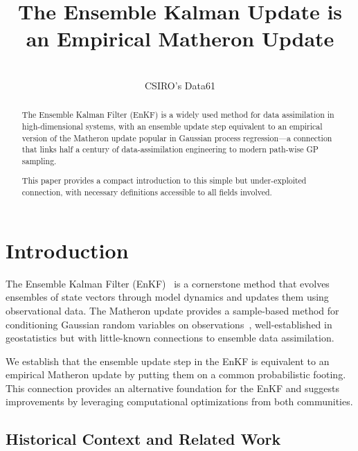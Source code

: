 \documentclass[wcp]{jmlr} %
\title[Ensemble Kalman Update]{The Ensemble Kalman Update is an Empirical Matheron Update}
\author{\Name{Dan MacKinlay\,\orcidlink{0000-0001-6077-2684}}\\
  \addr CSIRO's Data61}
\begin{document}
\maketitle

\begin{abstract}
The Ensemble Kalman Filter (EnKF) is a widely used method for data assimilation in high-dimensional systems, with an ensemble update step equivalent to an empirical version of the Matheron update popular in Gaussian process regression—a connection that links half a century of data-assimilation engineering to modern path-wise GP sampling.

This paper provides a compact introduction to this simple but under-exploited connection, with necessary definitions accessible to all fields involved.
\end{abstract}


\section{Introduction}

The Ensemble Kalman Filter (EnKF)~\citep{Evensen2003Ensemble,Evensen2009Data} is a cornerstone method that evolves ensembles of state vectors through model dynamics and updates them using observational data. The Matheron update provides a sample-based method for conditioning Gaussian random variables on observations~\citep{Doucet2010Note,Wilson2020Efficiently,Wilson2021Pathwise}, well-established in geostatistics but with little-known connections to ensemble data assimilation.

We establish that the ensemble update step in the EnKF is equivalent to an empirical Matheron update by putting them on a common probabilistic footing. This connection provides an alternative foundation for the EnKF and suggests improvements by leveraging computational optimizations from both communities.

\subsection{Historical Context and Related Work}\label{sec:history}
\end{document}
